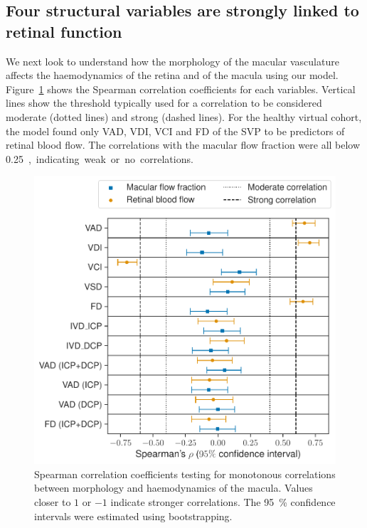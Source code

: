 \documentclass[11pt,]{article}
\begin{document}
\subsection{Four structural variables are strongly linked to retinal function}\label{sec:StructureAndFunction}

We next look to understand how the morphology of the macular vasculature affects the haemodynamics of the retina and of the macula using our model.
Figure~\ref{fig:SpearmanCorrelations} shows the Spearman correlation coefficients for each variables.
Vertical lines show the threshold typically used for a correlation to be considered moderate (dotted lines) and strong (dashed lines).
For the healthy virtual cohort, the model found only VAD, VDI, VCI and FD of the SVP to be predictors of retinal blood flow.
The correlations with the macular flow fraction were all below \SI{0.25}, indicating weak or no correlations.

\begin{figure}[ht!]
  \centering
  \includegraphics[width=.95\textwidth]{SpearmanCoefficients}
  \caption{\label{fig:SpearmanCorrelations}Spearman correlation coefficients testing for monotonous correlations between morphology and haemodynamics of the macula. Values closer to $1$ or $-1$ indicate stronger correlations. The \SI{95}{\percent} confidence intervals were estimated using bootstrapping.}
\end{figure}
\end{document}
